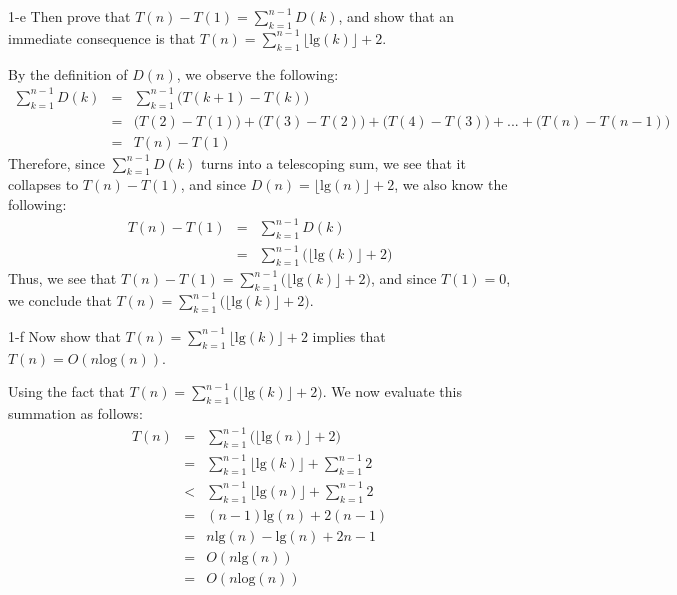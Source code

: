 \documentclass[11pt]{article}
\newcommand{\tlg}{\text{lg}}
\newcommand{\tlog}{\text{log}}
\begin{document}
\begin{prob}{1-e}
Then prove that $T(n) - T(1) = \sum_{k=1}^{n-1} D(k)$, and show that an immediate consequence is that $T(n) = \sum_{k=1}^{n-1}\lfloor \tlg(k) \rfloor + 2$.
\end{prob}
\begin{sol}
By the definition of $D(n)$, we observe the following:
\begin{eqnarray*}
\sum_{k=1}^{n-1}D(k) & = & \sum_{k=1}^{n-1}\Big(T(k + 1) - T(k)\Big) \\
& = & \big(T(2) - T(1)\big) + \big(T(3) - T(2)\big) + \big(T(4) - T(3)\big) + ... + \big(T(n) - T(n-1)\big) \\
& = & T(n) - T(1) 
\end{eqnarray*}
Therefore, since $\sum_{k=1}^{n-1}D(k)$ turns into a telescoping sum, we see that it collapses to $T(n) - T(1)$, and since $D(n) = \Big\lfloor\tlg(n)\Big\rfloor + 2$, we also know the following:
\begin{eqnarray*}
T(n) - T(1) & = & \sum_{k=1}^{n-1}D(k) \\
& = & \sum_{k=1}^{n-1}\big(\Big\lfloor\tlg(k)\Big\rfloor + 2\big)
\end{eqnarray*}
Thus, we see that $T(n) - T(1) = \sum_{k=1}^{n-1}\big(\lfloor\tlg(k)\rfloor + 2\big)$, and since $T(1) = 0$, we conclude that $T(n) = \sum_{k=1}^{n-1}\big(\lfloor\tlg(k)\rfloor + 2\big)$.
\end{sol}

\begin{prob}{1-f}
Now show that $T(n) = \sum_{k=1}^{n-1}\lfloor \tlg(k) \rfloor + 2$ implies that $T(n) = O(n\tlog(n))$.
\end{prob}
\begin{sol}
Using the fact that $T(n) = \sum_{k=1}^{n-1}\big(\Big\lfloor\tlg(k)\Big\rfloor + 2\big)$. We now evaluate this summation as follows:
\begin{eqnarray*}
T(n) & = & \sum_{k=1}^{n-1}\big(\lfloor\tlg(n)\rfloor + 2\big) \\ 
& = & \sum_{k=1}^{n-1}\lfloor\tlg(k)\rfloor + \sum_{k=1}^{n-1}2 \\
& < & \sum_{k=1}^{n-1}\lfloor\tlg(n)\rfloor + \sum_{k=1}^{n-1}2 \\
& = & (n-1)\tlg(n) + 2(n-1) \\
& = & n\tlg(n) - \tlg(n) + 2n - 1 \\
& = & O(n\tlg(n)) \\
& = & O(n\tlog(n))
\end{eqnarray*}
\end{sol}
\end{document}
